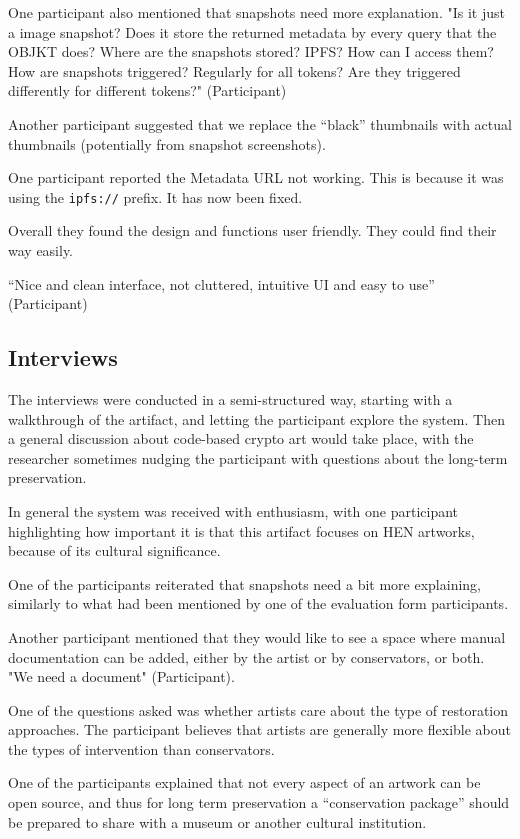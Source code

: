 One participant also mentioned that snapshots need more explanation. "Is it just a image snapshot? Does it store the returned metadata by every query that the OBJKT does? Where are the snapshots stored? IPFS? How can I access them? How are snapshots triggered? Regularly for all tokens? Are they triggered differently for different tokens?" (Participant)

Another participant suggested that we replace the ``black'' thumbnails with actual thumbnails (potentially from snapshot screenshots).

One participant reported the Metadata URL not working. This is because it was using the \texttt{ipfs://} prefix. It has now been fixed.

Overall they found the design and functions user friendly. They could find their way easily.

``Nice and clean interface, not cluttered, intuitive UI and easy to use'' (Participant)

\subsection{Interviews}

The interviews were conducted in a semi-structured way, starting with a walkthrough of the artifact, and letting the participant explore the system.
Then a general discussion about code-based crypto art would take place, with the researcher sometimes nudging the participant with questions about the long-term preservation. 

In general the system was received with enthusiasm, with one participant highlighting how important it is that this artifact focuses on HEN artworks, because of its cultural significance.

One of the participants reiterated that snapshots need a bit more explaining, similarly to what had been mentioned by one of the evaluation form participants.

Another participant mentioned that they would like to see a space where manual documentation can be added, either by the artist or by conservators, or both. "We need a document" (Participant).

One of the questions asked was whether artists care about the type of restoration approaches. The participant believes that artists are generally more flexible about the types of intervention than conservators.

One of the participants explained that not every aspect of an artwork can be open source, and thus for long term preservation a ``conservation package'' should be prepared to share with a museum or another cultural institution.

